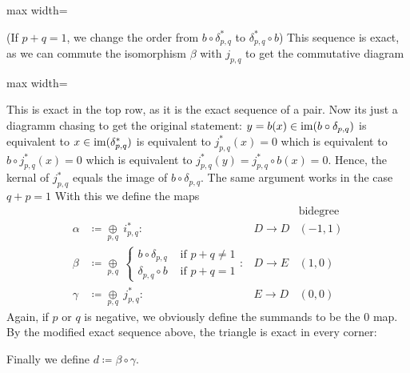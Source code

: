 \begin{definition}
\begin{center}
	\begin{adjustbox}{max width=\textwidth}
	\end{adjustbox}		
	\end{center}
	(If $p+q=1$, we change the order from $b\circ \delta_{p,q}^*$ to $\delta_{p,q}^*\circ b$) This sequence is exact, as we can commute the isomorphism $\beta$ with $j_{p,q}$ to get the commutative diagram
	\begin{center}
		\begin{adjustbox}{max width=\textwidth}
		\end{adjustbox}
	\end{center}
	This is exact in the top row, as it is the exact sequence of a pair. Now its just a diagramm chasing to get the original statement: $y=b(x)\in \mathrm{im}(b\circ \delta_{p,q})$ is equivalent to $x\in \mathrm{im}(\delta_{p,q}^*)$ is equivalent to $j_{p,q}^*(x)=0$ which is equivalent to $b\circ j_{p,q}^*(x)=0$ which is equivalent to $j_{p,q}^*(y)=j_{p,q}^*\circ b(x)=0$. Hence, the kernal of $j_{p,q}^*$ equals the image of $b\circ \delta_{p,q}$. The same argument works in the case $q+p=1$
	With this we define the maps 
	\begin{equation*}
		\begin{array}{lll|l}
			&&&\text{bidegree}\\
			\alpha&\coloneq \mathop{\oplus}\limits_{p,q}~i_{p,q}^*:&D\to D&(-1,1)\\
			\beta&\coloneq  \mathop{\oplus}\limits_{p,q}~\begin{cases}
				b\circ \delta_{p,q} & \text{ if }p+q\neq 1\\
				 \delta_{p,q} \circ b &\text{ if }p+q= 1
			\end{cases}:&D\to E&(1,0)\\
			\gamma&\coloneq \mathop{\oplus}\limits_{p,q}~j_{p,q}^*:&E\to D&(0,0)
		\end{array}
	\end{equation*}
	Again, if $p$ or $q$ is negative, we obviously define the summands to be the $0$ map. 
	By the modified exact sequence above, the triangle is exact in every corner:
	\begin{center}
	\end{center}
Finally we define $d\coloneq \beta\circ \gamma$.
\end{definition}
